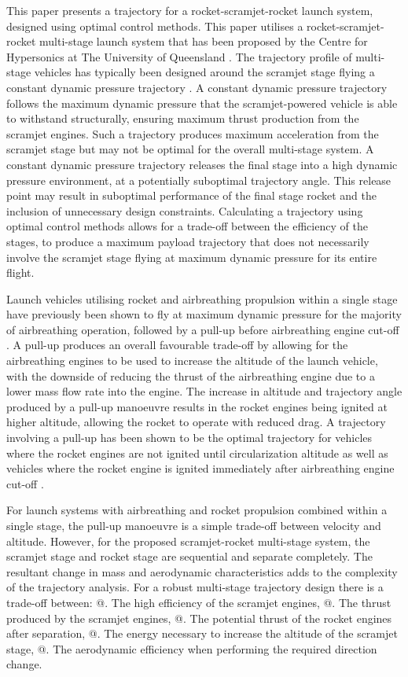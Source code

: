 \documentclass[]{aiaa-tc}
\makeatletter
\newcommand*{\rom}[1]{\expandafter\@slowromancap\romannumeral #1@}
\makeatother
\begin{document}
This paper presents a trajectory for a rocket-scramjet-rocket launch system, designed using optimal control methods. This paper utilises a rocket-scramjet-rocket multi-stage launch system that has been proposed by the Centre for Hypersonics at The University of Queensland \cite{Smart2009a}. 
The trajectory profile of multi-stage vehicles has typically been designed around the scramjet stage flying a constant dynamic pressure trajectory \cite{Kimura1999,Olds1998,Preller2015a}.
 A constant dynamic pressure trajectory follows the maximum dynamic pressure that the scramjet-powered vehicle is able to withstand structurally, ensuring maximum thrust production from the scramjet engines. 
 Such a trajectory produces maximum acceleration from the scramjet stage but may not be optimal for the overall multi-stage system. 
 A constant dynamic pressure trajectory releases the final stage into a high dynamic pressure environment, at a potentially suboptimal trajectory angle. This release point may result in suboptimal performance of the final stage rocket  and the inclusion of unnecessary design constraints. Calculating a trajectory using optimal control methods allows for a trade-off between the efficiency of the stages, to produce a maximum payload trajectory that does not necessarily involve the scramjet stage flying at maximum dynamic pressure for its entire flight.
 
  
 Launch vehicles utilising rocket and airbreathing propulsion within a single stage have previously been shown to fly at maximum dynamic pressure for the majority of airbreathing operation, followed by a pull-up before airbreathing engine cut-off \cite{Powell1991,Lu1993,Trefny1999}. 
A pull-up produces an overall favourable trade-off by allowing for the airbreathing engines to be used to increase the altitude of the launch vehicle, with the downside of reducing the thrust of the airbreathing engine due to a lower mass flow rate into the engine. The increase in altitude and trajectory angle produced by a pull-up manoeuvre results in the rocket engines being ignited at higher altitude, allowing the rocket to operate with reduced drag. A trajectory involving a pull-up has been shown to be the optimal trajectory for vehicles where the rocket engines are not ignited until circularization altitude \cite{Powell1991,Lu1993} as well as vehicles where the rocket engine is ignited immediately after airbreathing engine cut-off \cite{Trefny1999}.


 For launch systems with airbreathing and rocket propulsion combined within a single stage, the pull-up manoeuvre is a simple trade-off between velocity and altitude. However, for the proposed scramjet-rocket multi-stage system, the scramjet stage and rocket stage are sequential and separate completely.
 The resultant change in mass and aerodynamic characteristics adds to the complexity of the trajectory analysis.
 For a robust multi-stage trajectory design there is a trade-off between: 
 \rom{1}. The high efficiency of the scramjet engines,
\rom{2}. The thrust produced by the scramjet engines, 
\rom{3}. The potential thrust of the rocket engines after separation,
\rom{4}. The energy necessary to increase the altitude of the scramjet stage,
\rom{5}. The aerodynamic efficiency when performing the required direction change.
\end{document}
